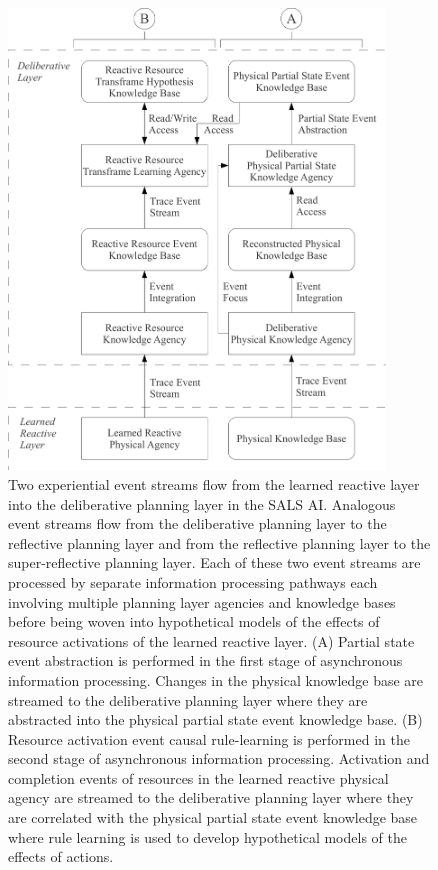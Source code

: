 \begin{figure}
\centering
\includegraphics[width=10cm]{gfx/deliberative_two_experiential_event_streams}
\caption[Two experiential event streams flow from the learned reactive
  layer into the deliberative planning layer in the SALS AI.]{Two
  experiential event streams flow from the learned reactive layer into
  the deliberative planning layer in the SALS AI.  Analogous event
  streams flow from the deliberative planning layer to the reflective
  planning layer and from the reflective planning layer to the
  super-reflective planning layer.  Each of these two event streams
  are processed by separate information processing pathways each
  involving multiple planning layer agencies and knowledge bases
  before being woven into hypothetical models of the effects of
  resource activations of the learned reactive layer.  (A) Partial
  state event abstraction is performed in the first stage of
  asynchronous information processing.  Changes in the physical
  knowledge base are streamed to the deliberative planning layer where
  they are abstracted into the physical partial state event knowledge
  base.  (B) Resource activation event causal rule-learning is
  performed in the second stage of asynchronous information
  processing.  Activation and completion events of resources in the
  learned reactive physical agency are streamed to the deliberative
  planning layer where they are correlated with the physical partial
  state event knowledge base where rule learning is used to develop
  hypothetical models of the effects of actions.}
\label{figure:deliberative_two_experiential_event_streams}
\end{figure}
